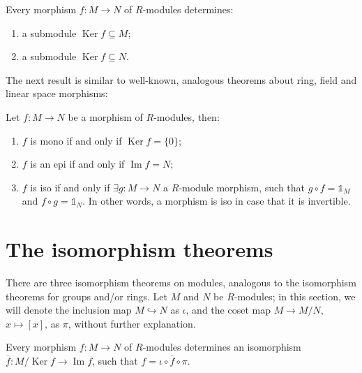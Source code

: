 \documentclass[12pt, a4paper, titlepage]{report}
\DeclareMathOperator{\Ker}{Ker}
\DeclareMathOperator{\Ima}{Im}
\begin{document}
\begin{rem}
  Every morphism $f : M \rightarrow N$ of $R$-modules determines:

  \begin{enumerate}
  \item a submodule $\Ker f \subseteq M$;
  \item a submodule $\Ker f \subseteq N$.
  \end{enumerate}
\end{rem}

The next result is similar to well-known, analogous theorems about ring, field and linear space morphisms:

\begin{lem}
  \label{lem:morph}
  Let $f : M \rightarrow N$ be a morphism of $R$-modules, then:

  \begin{enumerate}
  \item $f$ is mono if and only if $\Ker f = \{0\}$;
  \item $f$ is an epi if and only if $\Ima f = N$;
  \item $f$ is iso if and only if $\exists g : M \rightarrow N$ a $R$-module morphism,
    such that $g \circ f = \mathds{1}_M$ and $f \circ g = \mathds{1}_N$. In other words,
    a morphism is iso in case that it is invertible.
  \end{enumerate}
\end{lem}

\section{The isomorphism theorems}
There are three isomorphism theorems on modules, analogous to the isomorphism theorems for groups and/or rings.
Let $M$ and $N$ be $R$-modules; in this section, we will denote the inclusion map $M \hookrightarrow N$
as $\iota$, and the coset map $M \to M/N$, $x \mapsto [x]$, as $\pi$, without further explanation. 

\begin{thm}
  Every morphism $f : M \to N$ of $R$-modules determines an isomorphism $\overline{f} : M/\Ker f \to \Ima f$,
  such that $f = \iota \circ \overline{f} \circ \pi$.
\end{thm}
\end{document}
